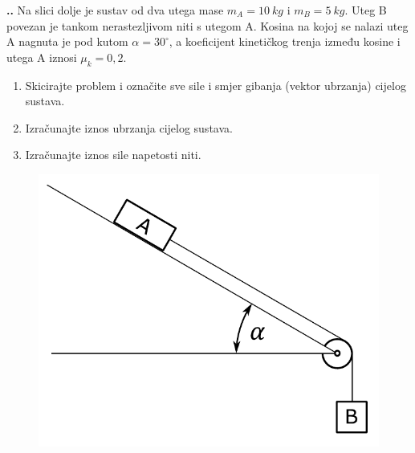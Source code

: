 

\noindent 
\textbf{
\thecjelina.\thezadatak.}
Na slici dolje je sustav od dva utega mase $m_A=10\ kg$ i $m_B=5\ kg$. Uteg B povezan je tankom nerastezljivom niti s utegom A. 
Kosina na kojoj se nalazi uteg A nagnuta je pod kutom $\alpha=30^\circ$, a koeficijent kinetičkog trenja između kosine i utega A iznosi $\mu_k=0,2$.
\begin{enumerate}[label=\alph*)]
 \item Skicirajte problem i označite sve sile i smjer gibanja (vektor ubrzanja) cijelog sustava.
 \item Izračunajte iznos ubrzanja cijelog sustava.
 \item Izračunajte iznos sile napetosti niti.
\end{enumerate}
\begin{figure}[h]%
  \begin{center}
    \includegraphics[scale=0.40]{Dinamika_materijalne_tocke/kosina_5_2.png}
  \end{center}
\end{figure}
